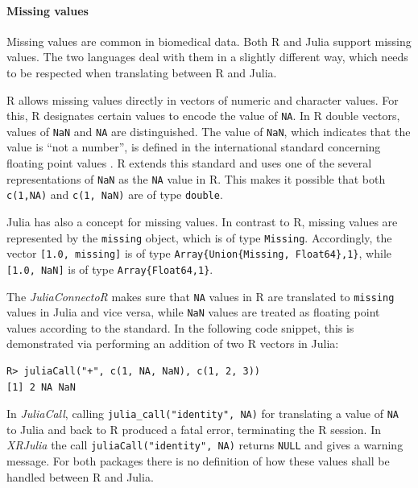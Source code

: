 \documentclass[12pt]{article}
\newcommand{\inlinecode}[1]{\texttt{#1}}
\newcommand{\apkg}[1]{\emph{#1}}
\begin{document}
\paragraph{Missing values}\label{juliaconnectorMissings}

Missing values are common in biomedical data. Both R and Julia support missing values.
The two languages deal with them in a slightly different way, which needs to be respected when translating between R and Julia.

R allows missing values directly in vectors of numeric and character values.
For this, R designates certain values to encode the value of \inlinecode{NA}.
In R double vectors, values of \inlinecode{NaN} and \inlinecode{NA} are distinguished.
The value of \inlinecode{NaN}, which indicates that the value is ``not a number'', is defined in the international standard concerning floating point values \citep{floatingpointstandard}.
R extends this standard and uses one of the several representations of \inlinecode{NaN} as the \inlinecode{NA} value in R.
This makes it possible that both \inlinecode{c(1,NA)} and \inlinecode{c(1, NaN)} are of type \inlinecode{double}.

Julia has also a concept for missing values.
In contrast to R, missing values are represented by the \inlinecode{missing} object, which is of type \inlinecode{Missing}. Accordingly, the vector \inlinecode{[1.0, missing]} is of type \inlinecode{Array\{Union\{Missing, Float64\},1\}}, while \inlinecode{[1.0, NaN]} is of type \inlinecode{Array\{Float64,1\}}.

The \apkg{JuliaConnectoR} makes sure that \inlinecode{NA} values in R are translated to \inlinecode{missing} values in Julia and vice versa, while \inlinecode{NaN} values are treated as floating point values according to the standard.
In the following code snippet, this is demonstrated via performing an addition of two R vectors in Julia:

\begin{lstlisting}
R> juliaCall("+", c(1, NA, NaN), c(1, 2, 3))
[1] 2 NA NaN
\end{lstlisting}


In \apkg{JuliaCall}, calling \inlinecode{julia\_call("identity", NA)} for translating a value of \inlinecode{NA} to Julia and back to R produced a fatal error, terminating the R session.
In \apkg{XRJulia} the call \inlinecode{juliaCall("identity", NA)} returns \inlinecode{NULL} and gives a warning message.
For both packages there is no definition of how these values shall be handled between R and Julia.
\end{document}
